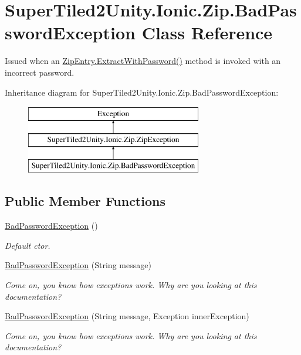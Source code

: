 \hypertarget{class_super_tiled2_unity_1_1_ionic_1_1_zip_1_1_bad_password_exception}{}\section{Super\+Tiled2\+Unity.\+Ionic.\+Zip.\+Bad\+Password\+Exception Class Reference}
\label{class_super_tiled2_unity_1_1_ionic_1_1_zip_1_1_bad_password_exception}


Issued when an {\ttfamily \mbox{\hyperlink{class_super_tiled2_unity_1_1_ionic_1_1_zip_1_1_zip_entry_a346d1d4eaf4ccb1274fe31629f3cb429}{Zip\+Entry.\+Extract\+With\+Password()}}} method is invoked with an incorrect password.  


Inheritance diagram for Super\+Tiled2\+Unity.\+Ionic.\+Zip.\+Bad\+Password\+Exception\+:\begin{figure}[H]
\begin{center}
\leavevmode
\includegraphics[height=3.000000cm]{class_super_tiled2_unity_1_1_ionic_1_1_zip_1_1_bad_password_exception}
\end{center}
\end{figure}
\subsection*{Public Member Functions}
\begin{DoxyCompactItemize}
\item 
\mbox{\hyperlink{class_super_tiled2_unity_1_1_ionic_1_1_zip_1_1_bad_password_exception_ae0f2e1ae0b7fe3c663fc273395cdd49c}{Bad\+Password\+Exception}} ()
\begin{DoxyCompactList}\small\item\em Default ctor. \end{DoxyCompactList}\item 
\mbox{\hyperlink{class_super_tiled2_unity_1_1_ionic_1_1_zip_1_1_bad_password_exception_a058231ee14325b4616bc5e58911ad720}{Bad\+Password\+Exception}} (String message)
\begin{DoxyCompactList}\small\item\em Come on, you know how exceptions work. Why are you looking at this documentation? \end{DoxyCompactList}\item 
\mbox{\hyperlink{class_super_tiled2_unity_1_1_ionic_1_1_zip_1_1_bad_password_exception_ad4c292840a3d371ab6946337c72792bf}{Bad\+Password\+Exception}} (String message, Exception inner\+Exception)
\begin{DoxyCompactList}\small\item\em Come on, you know how exceptions work. Why are you looking at this documentation? \end{DoxyCompactList}\end{DoxyCompactItemize}
